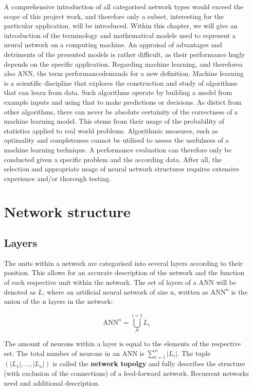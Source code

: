 \documentclass[10pt,a4paper,DIV=11]{scrreprt}
\begin{document}
A comprehensive introduction of all categorised network types would exceed the scope of this project work, and therefore only a subset, interesting for the particular application, will be introduced. Within this chapter, we will give an introduction of the terminology and mathematical models used to represent a neural network on a computing machine. An appraisal of advantages and detriments of the presented models is rather difficult, as their performance hugly depends on the specific application. Regarding machine learning, and thereforea also ANN, the term performancedemands for a new definition. Machine learning is a scientific discipline that explores the construction and study of algorithms that can learn from data.\cite{MLDEF1} Such algorithms operate by building a model from example inputs and using that to make predictions or decisions.\cite{MLDEF2} As distict from other algorithms, there can never be absolute certainity of the correctness of a machine learning model. This stems from their usage of the probability of statistics applied to real world problems. Algorithmic measures, such as optimality and completeness cannot be utilised to assess the usefulness of a machine learning technique. A performance evaluation can therefore only be conducted given a specific problem and the according data. After all, the selection and appropriate usage of neural network structures requires extensive experience and/or thorough testing. 

\section{Network structure}
\subsection{Layers}
The units within a network are categorised into several layers according to their position. This allows for an accurate description of the network and the function of each respective unit within the network. The set of layers of a ANN will be denoted as $L$, where an artificial neural network of size n, written as $\text{ANN}^n$ is the union of the n layers in the network:

\begin{equation}
    \text{ANN}^n = \bigcup_{N}^{i=1}{L_i}
\end{equation}

The amount of neurons within a layer is equal to the elements of the respective set. The total number of neurons in an ANN is $\sum_{i=1}^{n}{|L_i|}$. The tuple $(|L_1|,...,|L_n|)$ is called the \textbf{network topolgy} and fully describes the structure (with exclusion of the connections) of a feed-forward network. Recurrent networks need and additional description.
\end{document}
